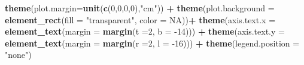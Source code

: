 \documentclass[12pt,twoside]{reedthesis}
\newenvironment{Shaded}{\begin{snugshade}}{\end{snugshade}}
\newcommand{\DataTypeTok}[1]{\textcolor[rgb]{0.13,0.29,0.53}{#1}}
\newcommand{\DecValTok}[1]{\textcolor[rgb]{0.00,0.00,0.81}{#1}}
\newcommand{\KeywordTok}[1]{\textcolor[rgb]{0.13,0.29,0.53}{\textbf{#1}}}
\newcommand{\NormalTok}[1]{#1}
\newcommand{\OperatorTok}[1]{\textcolor[rgb]{0.81,0.36,0.00}{\textbf{#1}}}
\newcommand{\OtherTok}[1]{\textcolor[rgb]{0.56,0.35,0.01}{#1}}
\newcommand{\StringTok}[1]{\textcolor[rgb]{0.31,0.60,0.02}{#1}}
\begin{document}
\begin{Shaded}
\begin{Highlighting}[]
\StringTok{  }\KeywordTok{theme}\NormalTok{(}\DataTypeTok{plot.margin=}\KeywordTok{unit}\NormalTok{(}\KeywordTok{c}\NormalTok{(}\DecValTok{0}\NormalTok{,}\DecValTok{0}\NormalTok{,}\DecValTok{0}\NormalTok{,}\DecValTok{0}\NormalTok{),}\StringTok{"cm"}\NormalTok{)) }\OperatorTok{+}
\StringTok{  }\KeywordTok{theme}\NormalTok{(}\DataTypeTok{plot.background =} \KeywordTok{element_rect}\NormalTok{(}\DataTypeTok{fill =} \StringTok{"transparent"}\NormalTok{, }\DataTypeTok{color =} \OtherTok{NA}\NormalTok{))}\OperatorTok{+}
\StringTok{  }\KeywordTok{theme}\NormalTok{(}\DataTypeTok{axis.text.x =} \KeywordTok{element_text}\NormalTok{(}\DataTypeTok{margin =}  \KeywordTok{margin}\NormalTok{(}\DataTypeTok{t =}\DecValTok{2}\NormalTok{, }\DataTypeTok{b =} \DecValTok{-14}\NormalTok{))) }\OperatorTok{+}\StringTok{ }
\StringTok{  }\KeywordTok{theme}\NormalTok{(}\DataTypeTok{axis.text.y =} \KeywordTok{element_text}\NormalTok{(}\DataTypeTok{margin =}  \KeywordTok{margin}\NormalTok{(}\DataTypeTok{r =}\DecValTok{2}\NormalTok{, }\DataTypeTok{l =} \DecValTok{-16}\NormalTok{))) }\OperatorTok{+}
\StringTok{  }\KeywordTok{theme}\NormalTok{(}\DataTypeTok{legend.position =} \StringTok{"none"}\NormalTok{)}


\end{Highlighting}
\end{Shaded}
\end{document}
